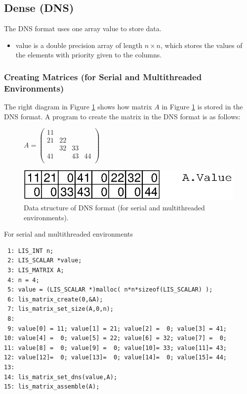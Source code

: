 \documentclass[a4paper]{article}
\begin{document}
\newpage
\subsection{Dense (DNS)}
The DNS format uses one array {\ttfamily value} to store data.
\begin{itemize}
\item {\ttfamily value} is a double precision array of length $n
      \times n$, which stores the values of the elements with priority given to the columns.
\end{itemize}

\subsubsection{Creating Matrices (for Serial and Multithreaded Environments)}
The right diagram in Figure \ref{fig:storage11} shows how matrix $A$ in Figure \ref{fig:storage11} is stored in the DNS format. A program to create the matrix in the DNS format is as follows:
\begin{figure}[h]
{\centering 
\begin{minipage}{0.3\textwidth}
\begin{flushright}
$ 
A = \left(
\begin{array}{cccc}
11 &    &    &    \\
21 & 22 &    &    \\
   & 32 & 33 &    \\
41 &    & 43 & 44 \\
\end{array}\right)
$
\end{flushright}
\end{minipage}
\begin{minipage}{0.6\textwidth}
\begin{flushleft}
\includegraphics{storage11.eps} 
\end{flushleft}
\end{minipage}
\caption{Data structure of DNS format (for serial and multithreaded environments).}\label{fig:storage11}}
\end{figure}
\begin{itemsquarebox}[l]{For serial and multithreaded environments}
\small
\begin{verbatim}
 1: LIS_INT n;
 2: LIS_SCALAR *value;
 3: LIS_MATRIX A;
 4: n = 4;
 5: value = (LIS_SCALAR *)malloc( n*n*sizeof(LIS_SCALAR) );
 6: lis_matrix_create(0,&A);
 7: lis_matrix_set_size(A,0,n);
 8:
 9: value[0] = 11; value[1] = 21; value[2] =  0; value[3] = 41;
10: value[4] =  0; value[5] = 22; value[6] = 32; value[7] =  0;
11: value[8] =  0; value[9] =  0; value[10]= 33; value[11]= 43;
12: value[12]=  0; value[13]=  0; value[14]=  0; value[15]= 44;
13:
14: lis_matrix_set_dns(value,A);
15: lis_matrix_assemble(A);
\end{verbatim}
\end{itemsquarebox}
\end{document}
